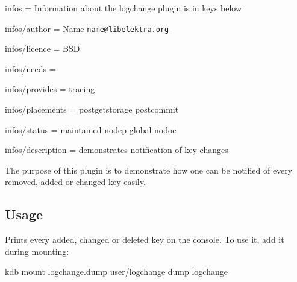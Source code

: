 
\begin{DoxyItemize}
\item infos = Information about the logchange plugin is in keys below
\item infos/author = Name \href{mailto:name@libelektra.org}{\tt name@libelektra.\+org}
\item infos/licence = B\+S\+D
\item infos/needs =
\item infos/provides = tracing
\item infos/placements = postgetstorage postcommit
\item infos/status = maintained nodep global nodoc
\item infos/description = demonstrates notification of key changes
\end{DoxyItemize}

The purpose of this plugin is to demonstrate how one can be notified of every removed, added or changed key easily.

\subsection*{Usage}

Prints every added, changed or deleted key on the console. To use it, add it during mounting\+: \begin{DoxyVerb}kdb mount logchange.dump user/logchange dump logchange\end{DoxyVerb}
 